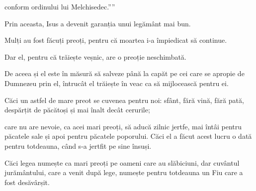 {\par }{\QB conform ordinului lui Melchisedec.””


\par }{\PP {}Prin aceasta, Isus a devenit garanția unui legământ mai bun.


\par }{\PP {}Mulți au fost făcuți preoți, pentru că moartea i-a împiedicat să continue.

Dar el, pentru că trăiește veșnic, are o preoție neschimbată.

De aceea și el este în măsură să salveze până la capăt pe cei care se apropie de Dumnezeu prin el, întrucât el trăiește în veac ca să mijlocească pentru ei.


\par }{\PP {}Căci un astfel de mare preot se cuvenea pentru noi: sfânt, fără vină, fără pată, despărțit de păcătoși și mai înalt decât cerurile;

care nu are nevoie, ca acei mari preoți, să aducă zilnic jertfe, mai întâi pentru păcatele sale și apoi pentru păcatele poporului. Căci el a făcut acest lucru o dată pentru totdeauna, când s-a jertfit pe sine însuși.

Căci legea numește ca mari preoți pe oameni care au slăbiciuni, dar cuvântul jurământului, care a venit după lege, numește pentru totdeauna un Fiu care a fost desăvârșit.



\par }
